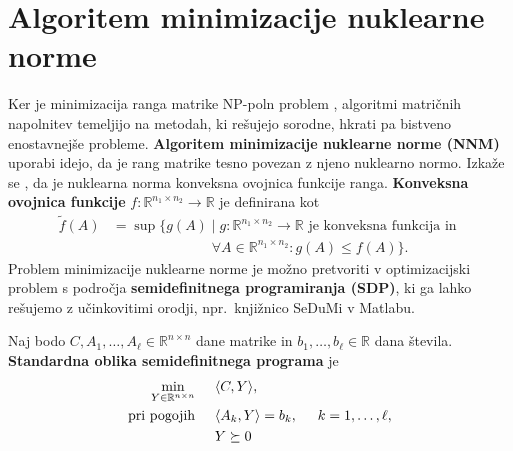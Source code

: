 \section{Algoritem minimizacije nuklearne norme} \label{1707-1755}
Ker je minimizacija ranga matrike NP-poln problem \cite{NNM-PHD}, algoritmi matričnih napolnitev temeljijo na metodah, ki rešujejo sorodne, hkrati pa bistveno enostavnejše probleme. \textbf{Algoritem minimizacije nuklearne norme (NNM)} uporabi idejo, da je rang matrike tesno povezan z njeno nuklearno normo.
Izkaže se \cite{NNM-PHD}, da je nuklearna norma konveksna ovojnica funkcije ranga.  \textbf{Konveksna ovojnica funkcije} $f : \mathbb{R}^{n_1 \times n_2} \rightarrow \mathbb{R}$ je definirana kot 
\begin{align*}
    \tilde{f}(A) 
    &= \sup\{g(A) \mid g:\mathbb R^{n_1\times n_2}\to \mathbb R \text{ je konveksna funkcija in }\\ 
    &\hspace{3cm}\forall A\in \mathbb R^{n_1\times n_2}: g(A) \leq f(A) \}.
\end{align*}
Problem minimizacije nuklearne norme je možno pretvoriti v optimizacijski problem s področja \textbf{semidefinitnega programiranja (SDP)}, ki ga lahko rešujemo z učinkovitimi orodji, npr.\ knjižnico SeDuMi \cite{SeDuMi} v Matlabu.

Naj bodo $C,A_1,\ldots,A_\ell \in \mathbb{R}^{n \times n}$ dane matrike in $b_1,\ldots,b_\ell\in \mathbb R$ dana števila.
\textbf{Standardna oblika semidefinitnega programa} je
\begin{align}
\label{1007-1829} 
\begin{split}
    \min_{Y\in \mathbb R^{n\times n}} \hspace{0.5cm}             & \langle C, Y \rangle,                                                                         \\
    \text{pri pogojih} \hspace{0.5cm} & \langle A_k, Y \rangle = b_k, \hspace{0.5cm} k = 1, \hdots , \ell,\\
                                      & Y \succeq 0
\end{split}
\end{align}

